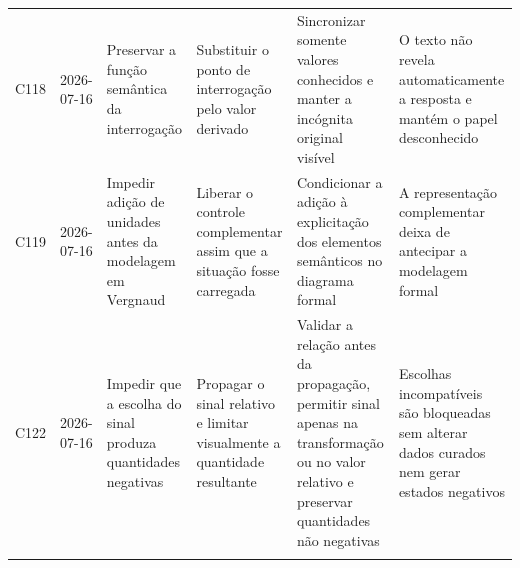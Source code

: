 \begin{landscape}
\begin{longtable}{p{1.0cm}p{1.9cm}p{4.0cm}p{5.0cm}p{6.2cm}p{5.7cm}}
\addlinespace[2pt]
C118 & 2026-07-16 & Preservar a função semântica da interrogação & Substituir o ponto de interrogação pelo valor derivado & Sincronizar somente valores conhecidos e manter a incógnita original visível & O texto não revela automaticamente a resposta e mantém o papel desconhecido \\
\addlinespace[2pt]
C119 & 2026-07-16 & Impedir adição de unidades antes da modelagem em Vergnaud & Liberar o controle complementar assim que a situação fosse carregada & Condicionar a adição à explicitação dos elementos semânticos no diagrama formal & A representação complementar deixa de antecipar a modelagem formal \\
\addlinespace[2pt]
C122 & 2026-07-16 & Impedir que a escolha do sinal produza quantidades negativas & Propagar o sinal relativo e limitar visualmente a quantidade resultante & Validar a relação antes da propagação, permitir sinal apenas na transformação ou no valor relativo e preservar quantidades não negativas & Escolhas incompatíveis são bloqueadas sem alterar dados curados nem gerar estados negativos \\
\addlinespace[2pt]
\bottomrule
\end{longtable}
\endgroup
\end{landscape}
